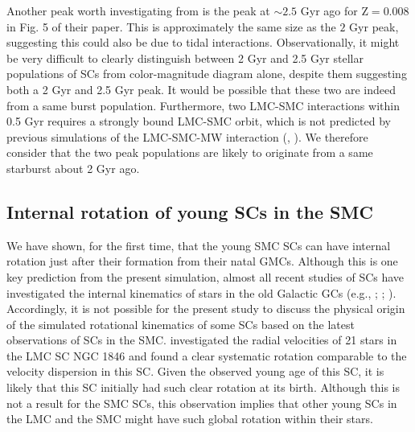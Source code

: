 \documentclass[fleqn,usenatbib]{mnras}
\begin{document}
 
Another peak worth investigating from \cite{1Rafelski_Zaritsky2005} is the peak at ${\sim}2.5$ Gyr ago for Z$=0.008$ in Fig. 5 of their paper. This is approximately the same size as the $2$ Gyr peak, suggesting this could also be due to tidal interactions. Observationally, it might be very difficult to clearly distinguish between 2 Gyr and 2.5 Gyr stellar populations of SCs from color-magnitude diagram alone, despite them suggesting both a 2 Gyr and 2.5 Gyr peak. It would be possible that these two are indeed from a same burst population. Furthermore, two LMC-SMC interactions within 0.5 Gyr requires a strongly bound LMC-SMC orbit, which is not predicted by previous simulations of the LMC-SMC-MW interaction (\citealt{K15_Gardiner_Noguchi1996}, \citealt{K13_Besla_et_al2012}). We therefore consider that the two peak populations are likely to originate from a same starburst about 2 Gyr ago. 



\subsection{Internal rotation of young SCs in the SMC}
We have shown, for the first time, that the young SMC SCs can have internal rotation just after their formation from their natal GMCs. 
Although this is one key prediction from the present simulation, almost all recent studies of SCs have investigated the internal kinematics of stars in the old Galactic GCs (e.g., \citealt{K21_Barth_et_al2020}; \citealt{K24_Kamann_et_al2020}; \citealt{K25_Szigeti_et_al2021}).
Accordingly, it is not possible for the present study to discuss the physical origin of the simulated rotational kinematics of some SCs based on the latest observations of SCs in the SMC. \cite{K18_Mackey_et_al2013} investigated the radial velocities of 21 stars in the LMC SC NGC 1846 and found a clear systematic rotation comparable to the velocity dispersion in this SC. Given the observed young age of this SC, it is likely that this SC initially had such clear rotation at its birth. Although this is not a result for the SMC SCs, this observation implies that other young SCs in the LMC and the SMC might have such global rotation within their stars. 
\end{document}
